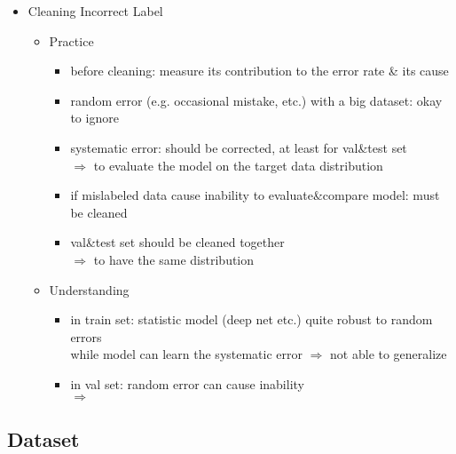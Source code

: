 \begin{itemize}
\item Cleaning Incorrect Label
	\begin{itemize}
	\item Practice 
		\begin{itemize}
		\item before cleaning: measure its contribution to the error rate \& its cause
		\item random error (e.g. occasional mistake, etc.) with a big dataset: okay to ignore
		\item systematic error: should be corrected, at least for val\&test set \\
		$\Rightarrow$ to evaluate the model on the target data distribution
		\item if mislabeled data cause inability to evaluate\&compare model: must be cleaned
		\item val\&test set should be cleaned together \\
		$\Rightarrow$ to have the same distribution
		\end{itemize}
	\item Understanding
		\begin{itemize}
		\item in train set: statistic model (deep net etc.) quite robust to random errors \\
		while model can learn the systematic error $\Rightarrow$ not able to generalize
		\item in val set: random error can cause inability  \\ 
		$\Rightarrow$ 
		\end{itemize}
	\end{itemize}
\end{itemize}

\subsection{Dataset}
